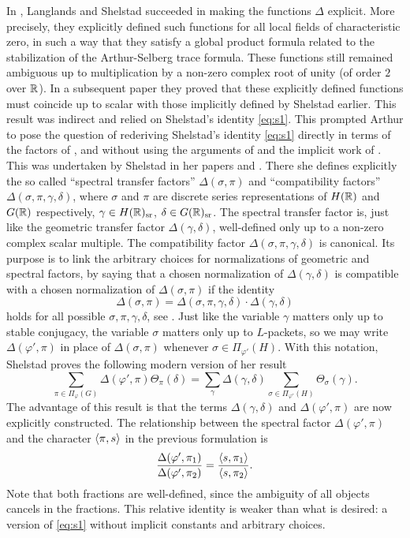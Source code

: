 \documentclass{article}
\theoremstyle{definition}
\numberwithin{equation}{section}
\renewcommand{\-}{\hyp{}}
\begin{document}
In \cite{LS87}, Langlands and Shelstad succeeded in making the functions $\Delta$ explicit. More precisely, they explicitly defined such functions for all local fields of characteristic zero, in such a way that they satisfy a global product formula related to the stabilization of the Arthur-Selberg trace formula. These functions still remained ambiguous up to multiplication by a non-zero complex root of unity (of order $2$ over $\mathbb{R}$). In a subsequent paper \cite[Theorem 2.6.A]{LS90} they proved that these explicitly defined functions must coincide up to scalar with those implicitly defined by Shelstad earlier. This result was indirect and relied on Shelstad's identity \eqref{eq:s1}. This prompted Arthur to pose the question \cite{Art08} of rederiving Shelstad's identity \eqref{eq:s1} directly in terms of the factors of \cite{LS87}, and without using the arguments of \cite{LS90} and the implicit work of \cite{She82}. This was undertaken by Shelstad in her papers \cite{SheTE1} and \cite{SheTE2}. There she defines explicitly the so called ``spectral transfer factors'' $\Delta(\sigma,\pi)$ and ``compatibility factors'' $\Delta(\sigma,\pi,\gamma,\delta)$, where $\sigma$ and $\pi$ are discrete series representations of $H(\mathbb{R})$ and $G(\mathbb{R})$ respectively, $\gamma \in H(\mathbb{R})_{\textrm{sr}}$, $\delta \in G(\mathbb{R})_{\textrm{sr}}$. The spectral transfer factor is, just like the geometric transfer factor $\Delta(\gamma,\delta)$, well-defined only up to a non-zero complex scalar multiple. The compatibility factor $\Delta(\sigma,\pi,\gamma,\delta)$ is canonical. Its purpose is to link the arbitrary choices for normalizations of geometric and spectral factors, by saying that a chosen normalization of $\Delta(\gamma,\delta)$ is compatible with a chosen normalization of $\Delta(\sigma,\pi)$ if the identity
\[ \Delta(\sigma,\pi)  = \Delta(\sigma,\pi,\gamma,\delta) \cdot \Delta(\gamma,\delta) \]
holds for all possible $\sigma,\pi,\gamma,\delta$, see \cite[\S4]{SheTE2}. Just like the variable $\gamma$ matters only up to stable conjugacy, the variable $\sigma$ matters only up to $L$\-packets, so we may write $\Delta(\varphi',\pi)$ in place of $\Delta(\sigma,\pi)$ whenever $\sigma \in \Pi_{\varphi'}(H)$. With this notation, Shelstad proves the following modern version of her result
\begin{equation} \label{eq:s2}
	\sum_{\pi \in \Pi_\varphi(G)}\Delta(\varphi',\pi)\Theta_\pi(\delta) = \sum_\gamma \Delta(\gamma,\delta)\sum_{\sigma \in \Pi_{\varphi'}(H)} \Theta_{\sigma}(\gamma).
\end{equation}
The advantage of this result is that the terms $\Delta(\gamma,\delta)$ and $\Delta(\varphi',\pi)$ are now explicitly constructed. The relationship between the spectral factor $\Delta(\varphi',\pi)$ and the character $\langle\pi,s\rangle$ in the previous formulation is
\[ \frac{\Delta(\varphi',\pi_1)}{\Delta(\varphi',\pi_2)} = \frac{\langle s,\pi_1\rangle}{\langle s,\pi_2\rangle}.\]
Note that both fractions are well-defined, since the ambiguity of all objects cancels in the fractions. This relative identity is weaker than what is desired: a version of \eqref{eq:s1} without implicit constants and arbitrary choices.
\end{document}
